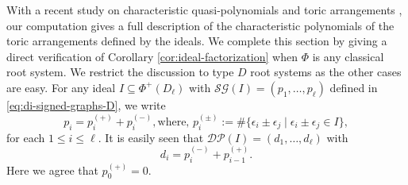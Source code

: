 \documentclass[12pt]{amsart}
\theoremstyle{plain}
\theoremstyle{definition}
\theoremstyle{remark}
\newcommand{\DP}{{\mathcal{DP}}}
\newcommand{\SG}{{\mathcal{SG}}}
\begin{document}
With a recent study on characteristic quasi-polynomials and toric arrangements \cite[Corollary 5.6]{LTY17}, our computation gives a full description of the characteristic polynomials of the toric arrangements defined by the ideals.
We complete this section by giving a direct verification of Corollary \ref{cor:ideal-factorization} when $\Phi$ is any classical root system. 
We restrict the discussion to type $D$ root systems as the other cases are easy.
For any ideal $I\subseteq\Phi^+(D_\ell)$ with $\SG(I)=(p_1,\ldots,p_\ell)$ defined in \eqref{eq:di-signed-graphs-D}, we write 
$$p_i=p_i^{(+)}+p_i^{(-)}, \mbox{where, } p_i^{(\pm)}:=\#\{ \epsilon_i \pm\epsilon_{j} \mid \epsilon_i \pm\epsilon_{j} \in I \},$$
for each $1 \le i \le \ell$. 
It is easily seen that $\DP(I)=(d_1,\ldots,d_\ell)$ with 
$$d_i=p_i^{(-)}+p_{i-1}^{(+)}.$$
Here we agree that $p_{0}^{(+)} = 0$.
\end{document}
